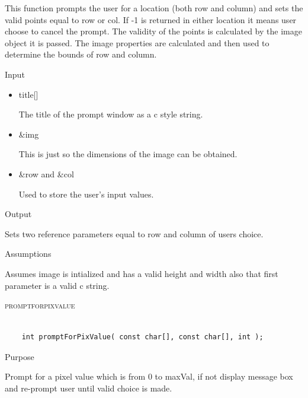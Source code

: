 \documentclass[pdftex, 11pt]{article}
\begin{document}
\begin{description}
\begin{description}
				This function prompts the user for a location (both row and column) and sets
				the valid points equal to row or col.  If -1 is returned in either location
				it means user choose to cancel the prompt.  The validity of the points is
				calculated by the image object it is passed.  The image properties are
				calculated and then used to determine the bounds of row and column.

			\item{Input}

				\begin{itemize}

					\item{title[]}

						The title of the prompt window as a c style string.

					\item{\&img}

						This is just so the dimensions of the image can be obtained.

					\item{\&row and \&col}

						Used to store the user's input values.

				\end{itemize}

			\item{Output}

				Sets two reference parameters equal to row and column of
				users choice.

			\item{Assumptions}

				Assumes image is intialized and has a valid height and width
				also that first parameter is a valid c string.

		\end{description}



	\item{\textsc{promptforpixvalue}}

		\begin{lstlisting}

	int promptForPixValue( const char[], const char[], int );
		\end{lstlisting}

		\begin{description}
			\item{Purpose}

				Prompt for a pixel value which is from 0 to maxVal, if not display message
				box and re-prompt user until valid choice is made.


\end{description}
\end{description}
\end{document}
